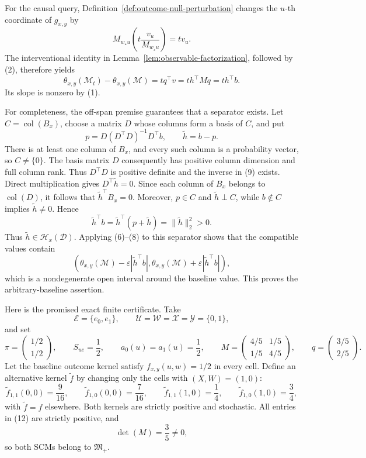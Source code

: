 For the causal query, Definition~\ref{def:outcome-null-perturbation} changes the \(u\)-th coordinate of \(g_{x,y}\) by
\[
M_{w_{\star}u}\left(t\frac{v_u}{M_{w_{\star}u}}\right)=tv_u.
\tag{7}
\]
The interventional identity in Lemma~\ref{lem:observable-factorization}, followed by (2), therefore yields
\[
\theta_{x,y}(\mathcal M_t)-\theta_{x,y}(\mathcal M)
=tq^{\top}v
=t h^{\top}Mq
=t h^{\top}b.
\tag{8}
\]
Its slope is nonzero by (1).

For completeness, the off-span premise guarantees that a separator exists. Let \(C=\operatorname{col}(B_x)\), choose a matrix \(D\) whose columns form a basis of \(C\), and put
\[
p=D(D^{\top}D)^{-1}D^{\top}b,
\qquad
\widetilde h=b-p.
\tag{9}
\]
There is at least one column of \(B_x\), and every such column is a probability vector, so \(C\ne\{0\}\). The basis matrix \(D\) consequently has positive column dimension and full column rank. Thus \(D^{\top}D\) is positive definite and the inverse in (9) exists. Direct multiplication gives \(D^{\top}\widetilde h=0\). Since each column of \(B_x\) belongs to \(\operatorname{col}(D)\), it follows that \(\widetilde h^{\top}B_x=0\). Moreover, \(p\in C\) and \(\widetilde h\perp C\), while \(b\notin C\) implies \(\widetilde h\ne0\). Hence
\[
\widetilde h^{\top}b
=\widetilde h^{\top}(p+\widetilde h)
=\|\widetilde h\|_2^2
>0.
\tag{10}
\]
Thus \(\widetilde h\in\mathcal H_x(\mathcal D)\). Applying (6)--(8) to this separator shows that the compatible values contain
\[
\left(
\theta_{x,y}(\mathcal M)-\varepsilon|\widetilde h^{\top}b|,
\theta_{x,y}(\mathcal M)+\varepsilon|\widetilde h^{\top}b|
\right),
\tag{11}
\]
which is a nondegenerate open interval around the baseline value. This proves the arbitrary-baseline assertion.

Here is the promised exact finite certificate. Take
\[
\mathcal E=\{e_0,e_1\},
\qquad
\mathcal U=\mathcal W=\mathcal X=\mathcal Y=\{0,1\},
\]
and set
\[
\pi=\begin{pmatrix}1/2\\1/2\end{pmatrix},
\qquad
S_{ue}=\frac12,
\qquad
a_0(u)=a_1(u)=\frac12,
\qquad
M=\begin{pmatrix}4/5&1/5\\1/5&4/5\end{pmatrix},
\qquad
q=\begin{pmatrix}3/5\\2/5\end{pmatrix}.
\tag{12}
\]
Let the baseline outcome kernel satisfy \(f_{x,y}(u,w)=1/2\) in every cell. Define an alternative kernel \(\widetilde f\) by changing only the cells with \((X,W)=(1,0)\):
\[
\widetilde f_{1,1}(0,0)=\frac9{16},
\qquad
\widetilde f_{1,0}(0,0)=\frac7{16},
\qquad
\widetilde f_{1,1}(1,0)=\frac14,
\qquad
\widetilde f_{1,0}(1,0)=\frac34,
\tag{13}
\]
with \(\widetilde f=f\) elsewhere. Both kernels are strictly positive and stochastic. All entries in (12) are strictly positive, and
\[
\det(M)=\frac35\ne0,
\tag{14}
\]
so both SCMs belong to \(\mathfrak M_{+}\).


